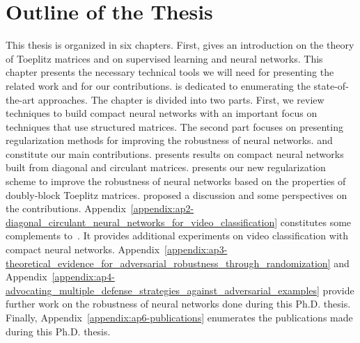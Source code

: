 \section*{Outline of the Thesis}
\label{section:ch1-outline_of_the_thesis}

This thesis is organized in six chapters.
First,  gives an introduction on the theory of Toeplitz matrices and on supervised learning and neural networks.
This chapter presents the necessary technical tools we will need for presenting the related work and for our contributions.
 is dedicated to enumerating the state-of-the-art approaches.
The chapter is divided into two parts.
First, we review techniques to build compact neural networks with an important focus on techniques that use structured matrices.
The second part focuses on presenting regularization methods for improving the robustness of neural networks.
 and  constitute our main contributions.
 presents results on compact neural networks built from diagonal and circulant matrices.
 presents our new regularization scheme to improve the robustness of neural networks based on the properties of doubly-block Toeplitz matrices.
 proposed a discussion and some perspectives on the contributions.
Appendix~\ref{appendix:ap2-diagonal_circulant_neural_networks_for_video_classification} constitutes some complements to~.
It provides additional experiments on video classification with compact neural networks.
Appendix~\ref{appendix:ap3-theoretical_evidence_for_adversarial_robustness_through_randomization} and Appendix~\ref{appendix:ap4-advocating_multiple_defense_strategies_against_adversarial_examples} provide further work on the robustness of neural networks done during this Ph.D. thesis.
Finally, Appendix~\ref{appendix:ap6-publications} enumerates the publications made during this Ph.D. thesis.




